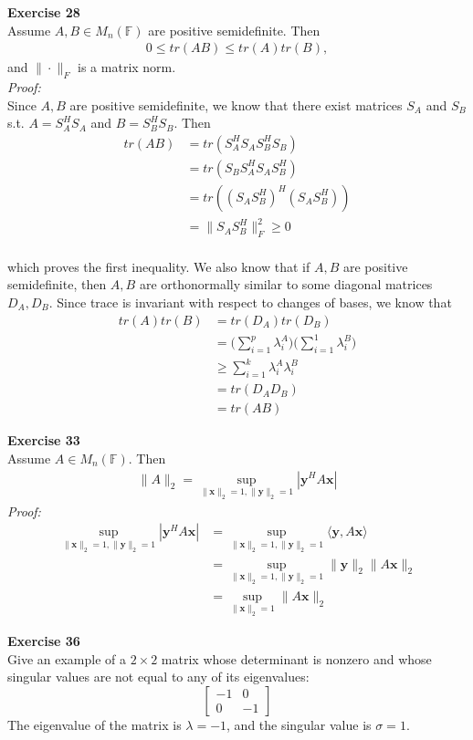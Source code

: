\documentclass[letterpaper,12pt]{article}
\let\vec\mathbf
\theoremstyle{definition}
\begin{document}
\textbf{Exercise 28} \\
Assume $A, B \in M_n(\mathbb{F})$ are positive semidefinite. Then
\begin{align*}
  0 \leq tr(AB) \leq tr(A) tr(B),
\end{align*}
and $\|\cdot\|_F$ is a matrix norm. \\
\textit{Proof:} \\
Since $A, B$ are positive semidefinite, we know that there exist matrices $S_A$ and $S_B$ s.t. $A = S_A^H S_A$ and $B = S_B^H S_B$. Then
\begin{align*}
  tr(AB) &= tr(S_A^H S_A S_B^H S_B) \\
  &= tr(S_B S_A^H S_A S_B^H) \\
  &= tr((S_A S_B^H)^H (S_A S_B^H)) \\
  &= \|S_A S_B^H\|_F^2 \geq 0
\end{align*} \\
which proves the first inequality.
We also know that if $A, B$ are positive semidefinite, then $A, B$ are orthonormally similar to some diagonal matrices $D_A, D_B$. Since trace is invariant with respect to changes of bases, we know that
\begin{align*}
  tr(A)tr(B) &= tr(D_A)tr(D_B) \\
  &= \Big(\sum_{i=1}^p \lambda_i^A\Big)\Big(\sum_{i=1}^1 \lambda_i^B\Big) \\
  & \geq \sum_{i=1}^k \lambda_i^A \lambda_i^B \\
  &= tr(D_A D_B) \\
  &= tr(AB)
\end{align*}

\textbf{Exercise 33} \\
Assume $A \in M_{n}(\mathbb{F})$. Then
\begin{align*}
  \|A\|_2 = \sup_{{\|\vec{x}\|_2=1}, {\|\vec{y}\|_2=1}} |\vec{y}^H A \vec{x}|
\end{align*}
\textit{Proof:}
\begin{align*}
  \sup_{{\|\vec{x}\|_2=1}, {\|\vec{y}\|_2=1}} |\vec{y}^H A \vec{x}|
  &= \sup_{{\|\vec{x}\|_2=1}, {\|\vec{y}\|_2=1}} \langle \vec{y}, A \vec{x} \rangle \\
  &= \sup_{{\|\vec{x}\|_2=1}, {\|\vec{y}\|_2=1}} \|\vec{y}\|_2 \|A \vec{x}\|_2 \\
  &= \sup_{\|\vec{x}\|_2=1} \|A \vec{x}\|_2
\end{align*}

\textbf{Exercise 36} \\
Give an example of a $2 \times 2$ matrix whose determinant is nonzero and whose singular values are not equal to any of its eigenvalues:
\[
\begin{bmatrix}
  -1 & 0 \\
  0 & -1
\end{bmatrix}
\]
The eigenvalue of the matrix is $\lambda = -1$, and the singular value is $\sigma = 1$. \\
\end{document}
